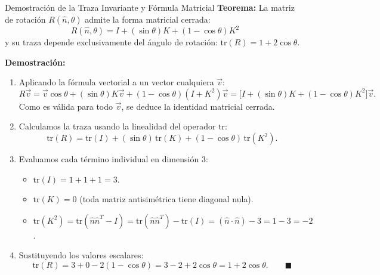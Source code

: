 \documentclass[10pt,aspectratio=169]{beamer}
\begin{document}
\begin{frame}{Demostración de la Traza Invariante y Fórmula Matricial}
  \footnotesize
  \textbf{Teorema:} La matriz de rotación $R(\hat{n}, \theta)$ admite la forma matricial cerrada:
  \[
  \boxed{R(\hat{n}, \theta) = I + (\sin\theta)K + (1 - \cos\theta)K^2}
  \]
  y su traza depende exclusivamente del ángulo de rotación: $\boxed{\mathrm{tr}(R) = 1 + 2\cos\theta}$.

  \textbf{Demostración:}
  \begin{enumerate}\itemsep3pt
    \item Aplicando la fórmula vectorial a un vector cualquiera $\vec{v}$:
    \[
    R\vec{v} = \vec{v}\cos\theta + (\sin\theta)K\vec{v} + (1 - \cos\theta)(I + K^2)\vec{v} = \big[I + (\sin\theta)K + (1 - \cos\theta)K^2\big]\vec{v}.
    \]
    Como es válida para todo $\vec{v}$, se deduce la identidad matricial cerrada.
    \item Calculamos la traza usando la linealidad del operador $\mathrm{tr}$:
    \[
    \mathrm{tr}(R) = \mathrm{tr}(I) + (\sin\theta)\,\mathrm{tr}(K) + (1 - \cos\theta)\,\mathrm{tr}(K^2).
    \]
    \item Evaluamos cada término individual en dimensión 3:
    \begin{itemize}\scriptsize
      \item $\mathrm{tr}(I) = 1 + 1 + 1 = 3$.
      \item $\mathrm{tr}(K) = 0$ (toda matriz antisimétrica tiene diagonal nula).
      \item $\mathrm{tr}(K^2) = \mathrm{tr}(\hat{n}\hat{n}^T - I) = \mathrm{tr}(\hat{n}\hat{n}^T) - \mathrm{tr}(I) = (\hat{n}\cdot\hat{n}) - 3 = 1 - 3 = -2$.
    \end{itemize}
    \item Sustituyendo los valores escalares:
    \[
    \mathrm{tr}(R) = 3 + 0 - 2(1 - \cos\theta) = 3 - 2 + 2\cos\theta = 1 + 2\cos\theta. \qquad \blacksquare
    \]
  \end{enumerate}
\end{frame}
\end{document}
